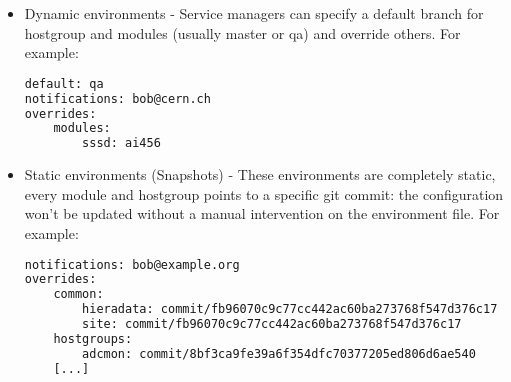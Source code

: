 \begin{itemize} 
    \item Dynamic environments - Service managers can specify a default branch for
hostgroup and modules (usually master or qa) and override others. For
example:

\begin{lstlisting}[language=bash, frame=single]
default: qa
notifications: bob@cern.ch
overrides:
    modules:
        sssd: ai456
\end{lstlisting}

    \item Static environments (Snapshots) - These environments are completely static,
every module and hostgroup points to a specific git commit: the
configuration won't be updated without a manual intervention on the
environment file. For example:

\begin{lstlisting}[language=bash, frame=single]
notifications: bob@example.org
overrides:
    common:
        hieradata: commit/fb96070c9c77cc442ac60ba273768f547d376c17
        site: commit/fb96070c9c77cc442ac60ba273768f547d376c17
    hostgroups:
        adcmon: commit/8bf3ca9fe39a6f354dfc70377205ed806d6ae540
    [...]
\end{lstlisting}
\end{itemize}
